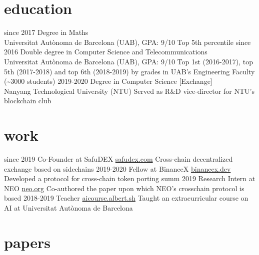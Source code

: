 \documentclass[]{friggeri-cv}
\begin{document}
\section{education}

\begin{entrylist}
  \entry
    {since 2017}
    {Degree in Maths}
    {\\Universitat Autònoma de Barcelona (UAB), GPA: 9/10}
    {Top 5th percentile}
  \entry
    {since 2016}
    {Double degree in Computer Science and Telecommunications}
    {\\Universitat Autònoma de Barcelona (UAB), GPA: 9/10}
	{Top 1st (2016-2017), top 5th (2017-2018) and top 6th (2018-2019) by grades in UAB’s Engineering Faculty (\textasciitilde3000 students)}
  \entry
    {2019-2020}
	{Degree in Computer Science [Exchange]}
    {\\Nanyang Technological University (NTU)}
    {Served as R\&D vice-director for NTU's blockchain club}
\end{entrylist}

\section{work}

\begin{entrylist}
  \entry
    {since 2019}
    {Co-Founder at SafuDEX}
    {\href{https://safudex.com}{safudex.com}}
    {Cross-chain decentralized exchange based on sidechains}
  \entry
    {2019-2020}
    {Fellow at BinanceX}
	{\href{https://binancex.dev}{binancex.dev}}
    {Developed a protocol for cross-chain token porting}
  \entry
    {summ 2019}
    {Research Intern at NEO}
	{\href{https://neo.org}{neo.org}}
    {Co-authored the paper upon which NEO's crosschain protocol is based}
  \entry
    {2018-2019}
    {Teacher}
    {\href{https://aicourse.albert.sh}{aicourse.albert.sh}}
    {Taught an extracurricular course on AI at Universitat Autònoma de Barcelona}
\end{entrylist}

\section{papers}
\end{document}
